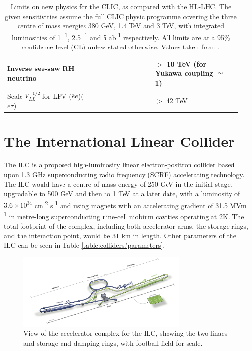 \begin{table}[b]
\begin{tabular}{p{0.35\linewidth}  p{0.25\linewidth} p{0.35\linewidth}}
	Inverse see-saw RH neutrino &  & $>$ 10 TeV (for Yukawa coupling $\simeq$ 1) \\ \hline

	Scale $V^{-1/2}_{LL}$ for LFV ($\overline{e}e$)($\overline{e}\tau$) & & $>$ 42 TeV \\ \hline \hline
	\end{tabular}
	\caption{Limits on new physics for the \acrlong{CLIC}, as compared with the \acrfull{HL-LHC}. The given sensitivities assume the full \acrshort{CLIC} physic programme covering the three centre of mass energies 380 GeV, 1.4 TeV and 3 TeV, with integrated luminosities of 1 \textsuperscript{-1}, 2.5 \textsuperscript{-1} and 5 ab\textsuperscript{-1} respectively. All limits are at a 95\% confidence level (CL) unless stated otherwise. Values taken from \cite{clic-yellow}.}
	\label{table:colliders/precisions}
\end{table}


\section{The International Linear Collider}
The \acrfull{ILC} is a proposed high-luminosity linear electron-positron collider based upon 1.3 GHz superconducting radio frequency (\acrshort{SCRF}) accelerating technology. The ILC would have a centre of mass energy of 250 GeV in the initial stage, upgradable to 500 GeV and then to 1 TeV at a later date, with a luminosity of $3.6\times 10^{34}$ cm\textsuperscript{-2} s\textsuperscript{-1} and using magnets with an accelerating gradient of 31.5 MVm\textsuperscript{-1} in metre-long superconducting nine-cell niobium cavities operating at 2K. The total footprint of the complex, including both accelerator arms, the storage rings, and the interaction point, would be 31 km in length. Other parameters of the \acrshort{ILC} can be seen in Table \ref{table:colliders/parameters}.

\begin{figure}[h]
	\centering
	\includegraphics[width=0.75\textwidth]{../Pictures/ILC-Schematic.jpg}
	\caption{View of the accelerator complex for the \acrlong{ILC}, showing the two linacs and storage and damping rings, with football field for scale.}
	\label{figure:colliders/ILC/main}
\end{figure}

